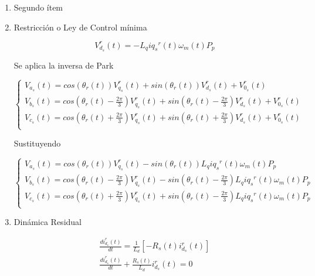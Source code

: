 \documentclass{article}
\begin{document}
\begin{enumerate}[label=\roman*.]
    \item Segundo ítem
    
    
    
    \item Restricción o Ley de Control mínima

    \begin{equation}
        V_{d_{s}}^r(t) = -L_{q}i{q_{s}}^r(t)\omega_{m}(t)P_{p}
    \end{equation}

    Se aplica la inversa de Park

    \begin{equation}
        \begin{cases}
            V_{a_{s}}(t) = cos(\theta_{r}(t))V_{q_{s}}^r(t) + sin(\theta_{r}(t))V_{d_{s}}^r(t) + V_{0_{s}}^r(t)\\
            V_{b_{s}}(t) = cos(\theta_{r}(t) - \frac{2\pi}{3})V_{q_{s}}^r(t) + sin(\theta_{r}(t) - \frac{2\pi}{3})V_{d_{s}}^r(t) + V_{0_{s}}^r(t)\\
            V_{c_{s}}(t) = cos(\theta_{r}(t) + \frac{2\pi}{3})V_{q_{s}}^r(t) + sin(\theta_{r}(t) + \frac{2\pi}{3})V_{d_{s}}^r(t) + V_{0_{s}}^r(t)\\
        \end{cases}
    \end{equation}

    Sustituyendo

    \begin{equation}
        \begin{cases}
            V_{a_{s}}(t) = cos(\theta_{r}(t))V_{q_{s}}^r(t) - sin(\theta_{r}(t))L_{q}i{q_{s}}^r(t)\omega_{m}(t)P_{p}\\
            V_{b_{s}}(t) = cos(\theta_{r}(t) - \frac{2\pi}{3})V_{q_{s}}^r(t) - sin(\theta_{r}(t) - \frac{2\pi}{3})L_{q}i{q_{s}}^r(t)\omega_{m}(t)P_{p}\\
            V_{c_{s}}(t) = cos(\theta_{r}(t) + \frac{2\pi}{3})V_{q_{s}}^r(t) + sin(\theta_{r}(t) - \frac{2\pi}{3})L_{q}i{q_{s}}^r(t)\omega_{m}(t)P_{p}\\
        \end{cases}
    \end{equation}

    \item Dinámica Residual
    
    \begin{equation}
        \begin{aligned}
        \frac{di_{d_{s}}^r(t)}{dt} = \frac{1}{L_{d}}[-R_{s}(t)i_{d_{s}}^r(t)] \\
        \frac{di_{d_{s}}^r(t)}{dt} + \frac{R_{s}(t)}{L_{d}}i_{d_{s}}^r(t) = 0 \\
        \end{aligned}
    \end{equation} 


\end{enumerate}
\end{document}
